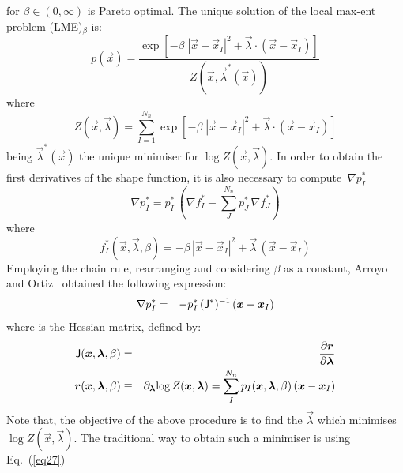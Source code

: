 for $\beta \in (0,\infty)$ is Pareto optimal. The unique solution of
the local max-ent problem (LME)$_\beta$ is: 
\begin{equation}
  \label{eq:LME-p}
p(\vec{x})=\frac{\exp\left[ -\beta \; |\vec{x}-\vec{x}_I|^2 +
    \vec{\lambda} \cdot (\vec{x}-\vec{x}_I) \right] } {Z(\vec{x},\vec{\lambda}^*(\vec{x}))}
\end{equation}
where
\begin{equation}
  \label{eq:LME-Z}
Z(\vec{x}, {\vec{\lambda}}) = \sum_{I=1}^{N_n}{ \exp \left[ -\beta \; |\vec{x}-\vec{x}_I|^2 + \vec{\lambda} \cdot (\vec{x}-\vec{x}_I)  \right]}
\end{equation}
being $\vec{\lambda}^*(\vec{x})$ the unique minimiser  for $\log
Z(\vec{x}, \vec{\lambda})$. In order to obtain the first derivatives of the shape function, it is also necessary to compute~$\nabla p^*_I$ 
\begin{equation}
  \label{eq:LME-grad-p}
\nabla p^*_I=p^*_I  \, \left(\nabla f^*_I-\sum_J^{N_n} p^*_J \, \nabla f^*_J\right)
\end{equation}
where
\begin{equation}
  \label{eq:LME-f}
f^*_I(\vec{x},  \vec{\lambda},\beta)=-\beta \, |\vec{x}-\vec{x}_I|^2 + \vec{\lambda}   \,  (\vec{x}-\vec{x}_I)
\end{equation}
Employing the chain rule, rearranging and considering $\beta$ as a constant, Arroyo and Ortiz~\cite{Arroyo2006} obtained the following expression:
\begin{eqnarray}
\nabla p^*_I &=& -p^*_I \,  (\tens{J}^*)^{-1} \,  (\vec{x} - \vec{x}_I) \label{eq26} 
\end{eqnarray}
where  is the Hessian matrix, defined by:
\begin{eqnarray}
\tens{J}(\vec{x},  \vec{\lambda},\beta) &=& \frac{\partial \vec{r}}{\partial  \vec{\lambda}} \label{eq27} \\ 
\vec{r}(\vec{x},\vec{\lambda},\beta) &\equiv& \partial_{\vec{\lambda}}{\log{ Z( \vec{x},\vec{\lambda}})} 
  =\sum_I^{N_n} p_I(\vec{x},\vec{\lambda},\beta) \, (\vec{x} - \vec{x}_I) \label{eq28} 
\end{eqnarray}
Note that, the objective of the above procedure is to find the
$\vec{\lambda}$ which minimises  $\log Z(\vec{x}, \vec{\lambda})$. The
traditional way to obtain such a minimiser  is using Eq.~(\ref{eq27})
